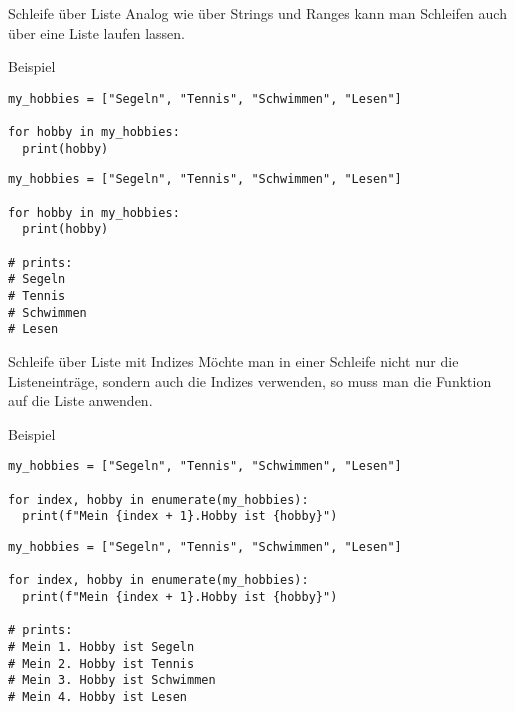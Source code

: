\begin{fragile}
\begin{block}{Schleife über Liste}
\vspace{2pt}
Analog wie über Strings und Ranges kann man Schleifen auch über eine Liste laufen lassen.  
\end{block}
\vspace{12pt}
\pause 

\begin{exampleblock}{Beispiel}
\vspace{2pt}
\begin{overprint}
\begin{verbatim}
my_hobbies = ["Segeln", "Tennis", "Schwimmen", "Lesen"]

for hobby in my_hobbies:
  print(hobby)
\end{verbatim}
\begin{verbatim}
my_hobbies = ["Segeln", "Tennis", "Schwimmen", "Lesen"]

for hobby in my_hobbies:
  print(hobby)
  
# prints:
# Segeln
# Tennis
# Schwimmen
# Lesen
\end{verbatim}
\end{overprint}
\end{exampleblock}
\end{fragile}


\begin{fragile}
\begin{block}{Schleife über Liste mit Indizes}
\vspace{2pt}
Möchte man in einer Schleife nicht nur die Listeneinträge, sondern auch die Indizes verwenden, so muss man die Funktion  auf die Liste anwenden. 
\end{block}
\vspace{12pt}
\pause 

\begin{exampleblock}{Beispiel}
\vspace{2pt}
\begin{overprint}
\begin{verbatim}
my_hobbies = ["Segeln", "Tennis", "Schwimmen", "Lesen"]

for index, hobby in enumerate(my_hobbies):
  print(f"Mein {index + 1}.Hobby ist {hobby}")
\end{verbatim}
\begin{verbatim}
my_hobbies = ["Segeln", "Tennis", "Schwimmen", "Lesen"]

for index, hobby in enumerate(my_hobbies):
  print(f"Mein {index + 1}.Hobby ist {hobby}")
  
# prints:
# Mein 1. Hobby ist Segeln
# Mein 2. Hobby ist Tennis
# Mein 3. Hobby ist Schwimmen
# Mein 4. Hobby ist Lesen
\end{verbatim}
\end{overprint}
\end{exampleblock}
\end{fragile}


